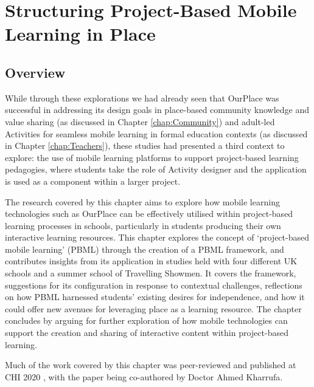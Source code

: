 \chapter{Structuring Project-Based Mobile Learning in Place}
\label{chap:student-created}

\section{Overview}
While through these explorations we had already seen that OurPlace was successful in addressing its design goals in place-based community knowledge and value sharing (as discussed in Chapter \ref{chap:Community}) and adult-led Activities for seamless mobile learning in formal education contexts (as discussed in Chapter \ref{chap:Teachers}), these studies had presented a third context to explore: the use of mobile learning platforms to support project-based learning pedagogies, where students take the role of Activity designer and the application is used as a component within a larger project.

The research covered by this chapter aims to explore how mobile learning technologies such as OurPlace can be effectively utilised within project-based learning processes in schools, particularly in students producing their own interactive learning resources. This chapter explores the concept of `project-based mobile learning' (PBML) through the creation of a PBML framework, and contributes insights from its application in studies held with four different UK schools and a summer school of Travelling Showmen. It covers the framework, suggestions for its configuration in response to contextual challenges, reflections on how PBML harnessed students' existing desires for independence, and how it could offer new avenues for leveraging place as a learning resource. The chapter concludes by arguing for further exploration of how mobile technologies can support the creation and sharing of interactive content within project-based learning.

Much  of the work covered by this chapter was peer-reviewed and published at CHI 2020 \citep{Richardson2020}, with the paper being co-authored by Doctor Ahmed Kharrufa.

